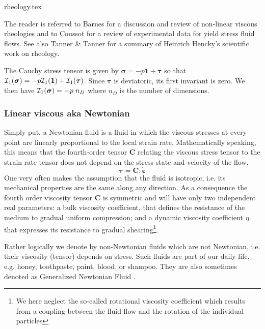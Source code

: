 \begin{flushright} {\tiny {\color{gray} rheology.tex}} \end{flushright}

The reader is referred to Barnes \cite{barn99}
for a discussion and review of non-linear viscous rheologies and 
to Coussot \cite{cous14} for a review of experimental data for yield stress fluid
flows. See also Tanner \& Tanner \cite{tata03} for a summary of Heinrich Hencky's 
scientific work on rheology. 



The Cauchy stress tensor is given by 
${\bm \sigma}=-p {\bm 1} + {\bm \tau}$ so that 
${\cal I}_1({\bm \sigma})=-p {\cal I}_1({\bm 1}) + {\cal I}_1({\bm \tau})$.
Since ${\bm \tau}$ is deviatoric, its first invariant is zero. We then have
${\cal I}_1({\bm \sigma})=-p\;  n_D$ where $n_D$ is the number of dimensions.

\subsubsection{Linear viscous aka Newtonian} 

Simply put, a Newtonian fluid is a fluid in which the viscous stresses at 
every point are linearly proportional 
to the local strain rate.
Mathematically speaking, this means that the fourth-order tensor ${\bm C}$ relating the viscous stress 
tensor to the strain rate tensor does not depend on the stress state and velocity of the flow.
\begin{equation}
{\bm \tau}={\bm C} : \dot{\bm \varepsilon}
\end{equation}
One very often makes the assumption that the fluid is isotropic, i.e. its mechanical properties are the 
same along any direction. As a consequence the fourth order viscosity tensor 
${\bm C}$ is symmetric and will have only two independent real parameters: 
a bulk viscosity coefficient, that defines the resistance of the medium to gradual uniform compression; 
and a dynamic viscosity coefficient $\eta$ that expresses its resistance to gradual 
shearing\footnote{We here neglect the so-called rotational viscosity coefficient which results 
from a coupling between the fluid flow and the rotation of the individual particles}.

Rather logically we denote by non-Newtonian fluids which are not Newtonian, i.e. their viscosity (tensor)
depends on stress. Such fluids are part of our daily life, e.g. honey, toothpaste, paint, blood, or shampoo.
They are also sometimes denoted as Generalized Newtonian Fluid . 

